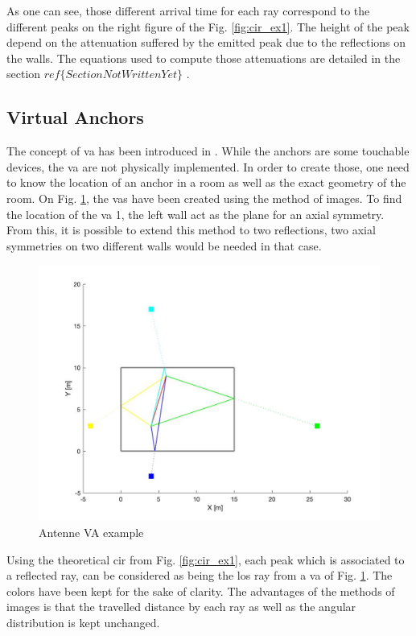 As one can see, those different arrival time for each ray correspond to the different peaks on the right figure of the Fig. \ref{fig:cir_ex1}. The height of the peak depend on the attenuation suffered by the emitted peak due to the reflections on the walls. The equations used to compute those attenuations are detailed in the section \color{red} $ref\{SectionNotWrittenYet\}$ \color{black}. 

\subsection{Virtual Anchors}

The concept of \gls{va} has been introduced in  \cite{meissner2010uwb}. While the anchors are some touchable devices, the \gls{va} are not physically implemented. In order to create those, one need to know the location of an anchor in a room as well as the exact geometry of the room. On Fig. \ref{fig:va_room}, the \gls{vas} have been created using the method of images. To find the location of the \gls{va} 1, the left wall act as the plane for an axial symmetry. From this, it is possible to extend this method to two reflections, two axial symmetries on two different walls would be needed in that case.

\begin{figure}[H]
	\centering
	\includegraphics[width=.6\linewidth]{Images/va_map.jpg}
	\caption{Antenne VA example}
	\label{fig:va_room}
\end{figure}
 
Using the theoretical \gls{cir} from Fig. \ref{fig:cir_ex1}, each peak which is associated to a reflected ray, can be considered as being the \gls{los} ray from a \gls{va} of Fig. \ref{fig:va_room}. The colors have been kept for the sake of clarity. The advantages of the methods of images is that the travelled distance by each ray as well as the angular distribution is kept unchanged.


